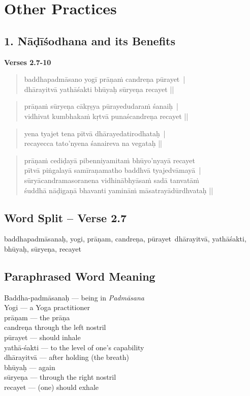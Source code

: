 \section*{Other Practices}

\subsection*{1. Nāḍīśodhana and its Benefits}

\noindent \textbf{Verses 2.7-10}

\begin{verse}
baddhapadmāsano yogī prāṇaṁ candreṇa pūrayet |\\
dhārayitvā yathāśakti bhūyaḥ sūryeṇa recayet ||
\end{verse}

\begin{verse}
prāṇaṁ sūryeṇa cākṛṣya pūrayedudaraṁ śanaiḥ |\\
vidhivat kumbhakaṁ kṛtvā punaścandreṇa recayet ||
\end{verse}

\begin{verse}
yena tyajet tena pītvā dhārayedatirodhataḥ |\\
recayecca tato'nyena śanaireva na vegataḥ ||
\end{verse}

\begin{verse}
prāṇaṁ cediḍayā pibenniyamitaṁ bhūyo'nyayā recayet\\
pītvā piṅgalayā samīraṇamatho baddhvā tyajedvāmayā |\\ 
sūryācandramasoranena vidhinābhyāsaṁ sadā tanvatāṁ\\
śuddhā nāḍigaṇā bhavanti yamināṁ māsatrayādūrdhvataḥ ||
\end{verse}

\subsection*{Word Split – Verse 2.7}


baddhapadmāsanaḥ, yogi, prāṇam, candreṇa, pūrayet dhārayitvā, yathāśakti, bhūyaḥ, sūryeṇa, recayet

\subsection*{Paraphrased Word Meaning}


\begin{multicols}{2}
Baddha-padmāsanaḥ --- being in \textit{Padmāsana} \\
Yogi --- a Yoga practitioner \\
prāṇam --- the prāṇa \\
candreṇa  through the left nostril \\
pūrayet --- should inhale \\
yathā-śakti --- to the level of one’s capability \\
dhārayitvā --- after holding (the breath)\\
bhūyaḥ --- again \\
sūryeṇa --- through the right nostril \\
recayet --- (one) should exhale 
\end{multicols}

